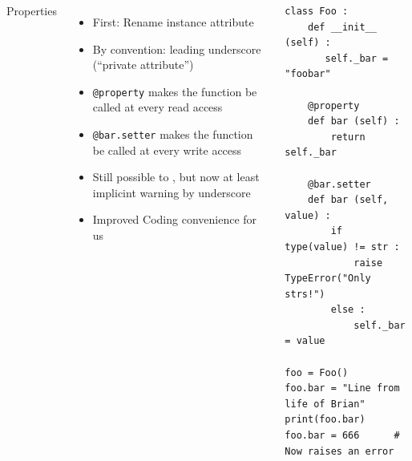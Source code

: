 \begin{frame}[fragile]
%
\begin{columns}[T]
\begin{Large}
	{Properties}
	\vspace{12pt}
\end{Large}
%
\begin{itemize}
\item First: Rename instance attribute
\item By convention: leading underscore (\enquote{private attribute})
\item \texttt{@property} makes the function be called at every read access
\item \texttt{@bar.setter} makes the function be called at every write access
\item Still possible to , but now at least implicint warning by underscore
\item Improved Coding convenience for us
\end{itemize}
%
\begin{codebox}
\begin{verbatim}
class Foo :
    def __init__ (self) :
       self._bar = "foobar"
   
    @property
    def bar (self) :
        return self._bar
   
    @bar.setter
    def bar (self, value) :
        if type(value) != str :
            raise TypeError("Only strs!")
        else :
            self._bar = value

foo = Foo()
foo.bar = "Line from life of Brian"
print(foo.bar)
foo.bar = 666      # Now raises an error
\end{verbatim}
\end{codebox}
\end{columns}
%
\end{frame}


